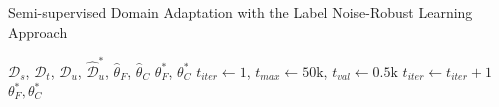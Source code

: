 \documentclass[a4paper,conference]{IEEEtran}
\begin{document}
\begin{algorithm}[!t]
\caption{Semi-supervised Domain Adaptation with the Label Noise-Robust Learning Approach}
\begin{algorithmic}
\REQUIRE $\mathcal{D}_{s}$, $\mathcal{D}_{t}$, $\mathcal{D}_{u}$, $\hat{\mathcal{D}}_{u}^{*}$, $\hat{\theta}_{F}$, $\hat{\theta}_{C}$
\ENSURE $\theta_{F}^{*}$, $\theta_{C}^{*}$
\STATE $t_{iter} \leftarrow 1$, $t_{max}\leftarrow50\text{k}$, $t_{val}\leftarrow0.5\text{k}$
\ENDIF
\STATE $t_{iter} \leftarrow t_{iter}+1$
\ENDWHILE
{}
\RETURN $\theta_{F}^{*}, \theta_{C}^{*}$
\end{algorithmic}
\end{algorithm}
\end{document}

